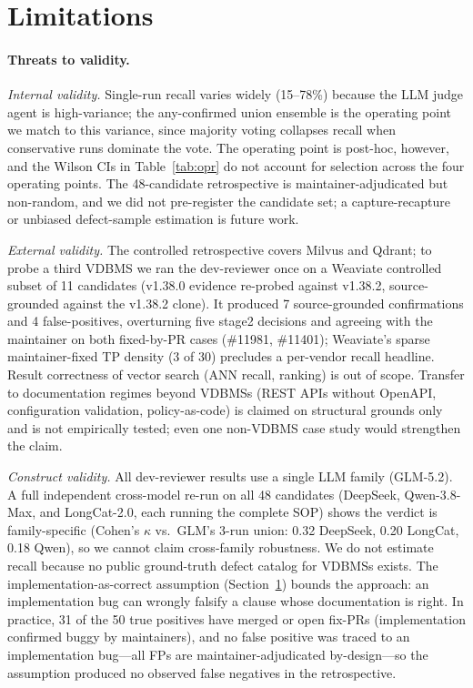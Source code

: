 \documentclass[sigconf]{acmart}
\begin{document}
\section{Limitations}
\label{sec:limit}

\paragraph{Threats to validity.}
\emph{Internal validity.} Single-run recall varies widely (15--78\%) because the LLM judge agent is high-variance; the any-confirmed union ensemble is the operating point we match to this variance, since majority voting collapses recall when conservative runs dominate the vote. The operating point is post-hoc, however, and the Wilson CIs in Table~\ref{tab:opr} do not account for selection across the four operating points. The 48-candidate retrospective is maintainer-adjudicated but non-random, and we did not pre-register the candidate set; a capture-recapture or unbiased defect-sample estimation is future work.

\emph{External validity.} The controlled retrospective covers Milvus and Qdrant; to probe a third VDBMS we ran the dev-reviewer once on a Weaviate controlled subset of 11 candidates (v1.38.0 evidence re-probed against v1.38.2, source-grounded against the v1.38.2 clone). It produced 7 source-grounded confirmations and 4 false-positives, overturning five stage2 decisions and agreeing with the maintainer on both fixed-by-PR cases (\#11981, \#11401); Weaviate's sparse maintainer-fixed TP density (3 of 30) precludes a per-vendor recall headline. Result correctness of vector search (ANN recall, ranking) is out of scope. Transfer to documentation regimes beyond VDBMSs (REST APIs without OpenAPI, configuration validation, policy-as-code) is claimed on structural grounds only and is not empirically tested; even one non-VDBMS case study would strengthen the claim.

\emph{Construct validity.} All dev-reviewer results use a single LLM family (GLM-5.2). A full independent cross-model re-run on all 48 candidates (DeepSeek, Qwen-3.8-Max, and LongCat-2.0, each running the complete SOP) shows the verdict is family-specific (Cohen's $\kappa$ vs.\ GLM's 3-run union: 0.32 DeepSeek, 0.20 LongCat, 0.18 Qwen), so we cannot claim cross-family robustness. We do not estimate recall because no public ground-truth defect catalog for VDBMSs exists. The implementation-as-correct assumption (Section~\ref{sec:limit}) bounds the approach: an implementation bug can wrongly falsify a clause whose documentation is right. In practice, 31 of the 50 true positives have merged or open fix-PRs (implementation confirmed buggy by maintainers), and no false positive was traced to an implementation bug---all FPs are maintainer-adjudicated by-design---so the assumption produced no observed false negatives in the retrospective.
\end{document}
